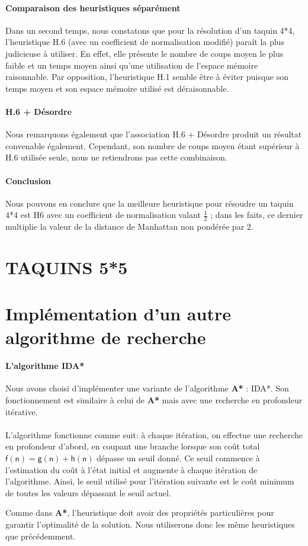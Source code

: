 \documentclass[10pt,a4paper]{report}
\begin{document}
\paragraph{Comparaison des heuristiques séparément}{Dans un second temps, nous constatons que pour la résolution d'un taquin 4*4, l'heuristique H.6 (avec un coefficient de normalisation modifié) paraît la plus judicieuse à utiliser. En effet, elle présente le nombre de coups moyen le plus faible et un temps moyen ainsi qu'une utilisation de l'espace mémoire raisonnable. Par opposition, l'heuristique H.1 semble être à éviter puisque son temps moyen et son espace mémoire utilisé est déraisonnable.}
\paragraph{H.6 + Désordre}{Nous remarquons également que l'association H.6 + Désordre produit un résultat convenable également. Cependant, son nombre de coups moyen étant supérieur à H.6 utilisée seule, nous ne retiendrons pas cette combinaison.}
\paragraph{Conclusion}{Nous pouvons en conclure que la meilleure heuristique pour résoudre un taquin 4*4 est H6 avec un coefficient de normalisation valant $\mathsf{\tfrac{1}{2}}$ ; dans les faits, ce dernier multiplie la valeur de la distance de Manhattan non pondérée par 2.}
\section{TAQUINS 5*5}
\section{Implémentation d'un autre algorithme de recherche}
\paragraph{L'algorithme IDA*}{Nous avons choisi d'implémenter une variante de l'algorithme \textbf{A*} : IDA*. Son fonctionnement est similaire à celui de \textbf{A*} mais avec une recherche en profondeur itérative.}
\paragraph{}{L'algorithme fonctionne comme suit: à chaque itération, on effectue une recherche en profondeur d'abord, en coupant une branche lorsque son coût total
$\mathsf{f(n) = g(n) + h(n)}$ dépasse un seuil donné. Ce seuil commence à l'estimation du coût à l'état initial et augmente à chaque itération de l'algorithme. Ainsi, le seuil utilisé pour l'itération suivante est le coût minimum de toutes les valeurs dépassant le seuil actuel.

Comme dans \textbf{A*}, l'heuristique doit avoir des propriétés particulières pour garantir l'optimalité de la solution. Nous utiliserons donc les même heuristiques que précédemment.}
\end{document}

